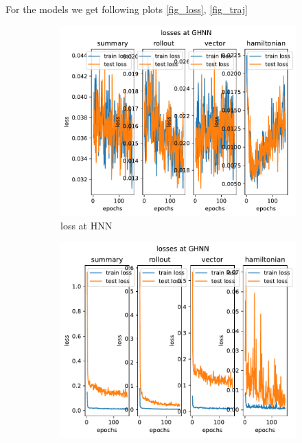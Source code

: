 For the models we get following plots \ref{fig_loss}, \ref{fig_traj}\
\begin{figure}[H]
	\centering
	\begin{subfigure}[b]{0.3\textwidth}
		\centering
		\includegraphics[width=\textwidth]{chapters/chapter5/fignew_hnn_loss.pdf}
		\caption{loss at HNN}
	\end{subfigure}
	\hfill
	\begin{subfigure}[b]{0.3\textwidth}
		\centering
		\includegraphics[width=\textwidth]{chapters/chapter5/fignew_ghnn_loss.pdf}

\end{subfigure}
\end{figure}
